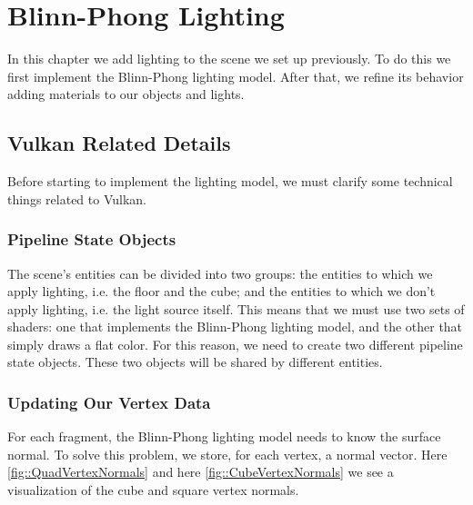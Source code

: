 \chapter{Blinn-Phong Lighting}

In this chapter we add lighting to the scene we set up previously.
To do this we first implement the Blinn-Phong lighting model.
After that, we refine its behavior adding materials to our objects and lights.

\section{Vulkan Related Details}

Before starting to implement the lighting model, we must clarify some technical
things related to Vulkan.

\subsection{Pipeline State Objects}

The scene's entities can be divided into two groups: the entities to which we
apply lighting, i.e. the floor and the cube; and the entities to which we
don't apply lighting, i.e. the light source itself.
This means that we must use two sets of shaders: one that implements
the Blinn-Phong lighting model, and the other that simply draws a flat color.
For this reason, we need to create two different pipeline state objects.
These two objects will be shared by different entities.

\subsection{Updating Our Vertex Data}

For each fragment, the Blinn-Phong lighting model needs to know the surface normal.
To solve this problem, we store, for each vertex, a normal vector.
Here \ref{fig::QuadVertexNormals} and here \ref{fig::CubeVertexNormals} we
see a visualization of the cube and square vertex normals.

